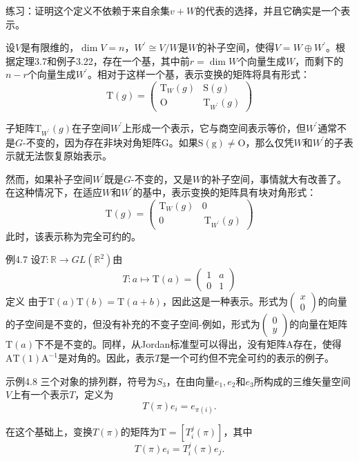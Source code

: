 \documentclass[hyperref,UTF8]{ctexbook}
\begin{document}
练习：证明这个定义不依赖于来自余集$v+W$的代表的选择，并且它确实是一个表示。

设$V$是有限维的，$\operatorname{dim} V=n$，$W^{\prime} \cong V / W$是$W$的补子空间，使得$V=W \oplus W^{\prime}$。根据定理3.7和例子3.22，存在一个基，其中前$r=\operatorname{dim} W$个向量生成$W$，而剩下的$n-r$个向量生成$W^{\prime}$。相对于这样一个基，表示变换的矩阵将具有形式：$$\mathrm{T}(g)=\begin{pmatrix}
\mathrm{T}_W(g) & \mathrm{S}(g) \\
\mathrm{O} & \mathrm{T}_{W^{\prime}}(g)
\end{pmatrix}$$

子矩阵$\mathrm{T}_{W^{\prime}}(g)$在子空间$W^{\prime}$上形成一个表示，它与商空间表示等价，但$W^{\prime}$通常不是$G$-不变的，因为存在非块对角矩阵$\mathrm{G}$。如果$\mathrm{S}(\mathrm{g}) \neq \mathrm{O}$，那么仅凭$W$和$W^{\prime}$的子表示就无法恢复原始表示。

然而，如果补子空间$W^{\prime}$既是$G$-不变的，又是$W$的补子空间，事情就大有改善了。在这种情况下，在适应$W$和$W^{\prime}$的基中，表示变换的矩阵具有块对角形式：
$$\mathrm{T}(g)=\begin{pmatrix}
\mathrm{T}_W(g) & 0 \\
0 & \mathrm{~T}_{W^{\prime}}(g)
\end{pmatrix}$$
此时，该表示称为完全可约的。

例4.7 设$T: \mathbb{R} \rightarrow G L\left(\mathbb{R}^2\right)$由$$T: a \mapsto \mathrm{T}(a)=\begin{pmatrix}
1 & a \\
0 & 1
\end{pmatrix}$$定义
由于$\mathrm{T}(a) \mathrm{T}(b)=\mathrm{T}(a+b)$，因此这是一种表示。形式为$\begin{pmatrix}x \\ 0\end{pmatrix}$的向量的子空间是不变的，但没有补充的不变子空间-例如，形式为$\begin{pmatrix}0 \\ y\end{pmatrix}$的向量在矩阵$\mathrm{T}(a)$下不是不变的。同样，从Jordan标准型可以得出，没有矩阵A存在，使得$\mathrm{AT}(1) \mathrm{A}^{-1}$是对角的。因此，表示$T$是一个可约但不完全可约的表示的例子。

示例4.8 三个对象的排列群，符号为$S_3$，在由向量$e_1, e_2$和$e_3$所构成的三维矢量空间$V$上有一个表示$T$，定义为
$$
T(\pi) e_i=e_{\pi(i)} .
$$

在这个基础上，变换$T(\pi)$的矩阵为$\mathrm{T}=\left[T_i^j(\pi)\right]$，其中
$$
T(\pi) e_i=T_i^j(\pi) e_j .
$$
\end{document}
